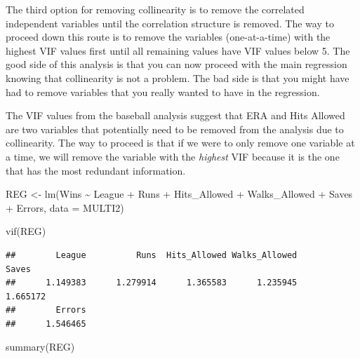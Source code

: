\documentclass[
]{book}
\newenvironment{Shaded}{\begin{snugshade}}{\end{snugshade}}
\newcommand{\AttributeTok}[1]{\textcolor[rgb]{0.77,0.63,0.00}{#1}}
\newcommand{\FunctionTok}[1]{\textcolor[rgb]{0.00,0.00,0.00}{#1}}
\newcommand{\NormalTok}[1]{#1}
\newcommand{\OtherTok}[1]{\textcolor[rgb]{0.56,0.35,0.01}{#1}}
\newcommand{\SpecialCharTok}[1]{\textcolor[rgb]{0.00,0.00,0.00}{#1}}
\begin{document}
The third option for removing collinearity is to remove the correlated independent variables until the correlation structure is removed. The way to proceed down this route is to remove the variables (one-at-a-time) with the highest VIF values first until all remaining values have VIF values below 5. The good side of this analysis is that you can now proceed with the main regression knowing that collinearity is not a problem. The bad side is that you might have had to remove variables that you really wanted to have in the regression.

The VIF values from the baseball analysis suggest that ERA and Hits Allowed are two variables that potentially need to be removed from the analysis due to collinearity. The way to proceed is that if we were to only remove one variable at a time, we will remove the variable with the \emph{highest} VIF because it is the one that has the most redundant information.

\begin{Shaded}
\begin{Highlighting}[]
\NormalTok{REG }\OtherTok{\textless{}{-}} \FunctionTok{lm}\NormalTok{(Wins }\SpecialCharTok{\textasciitilde{}}\NormalTok{ League }\SpecialCharTok{+}\NormalTok{ Runs }\SpecialCharTok{+}\NormalTok{ Hits\_Allowed }\SpecialCharTok{+}\NormalTok{ Walks\_Allowed }\SpecialCharTok{+}\NormalTok{ Saves }\SpecialCharTok{+}\NormalTok{ Errors, }\AttributeTok{data =}\NormalTok{ MULTI2)}

\FunctionTok{vif}\NormalTok{(REG)}
\end{Highlighting}
\end{Shaded}

\begin{verbatim}
##        League          Runs  Hits_Allowed Walks_Allowed         Saves 
##      1.149383      1.279914      1.365583      1.235945      1.665172 
##        Errors 
##      1.546465
\end{verbatim}

\begin{Shaded}
\begin{Highlighting}[]
\FunctionTok{summary}\NormalTok{(REG)}
\end{Highlighting}
\end{Shaded}
\end{document}
